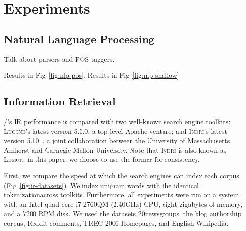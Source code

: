 \section{Experiments}

\subsection{Natural Language Processing}

Talk about parsers and POS taggers.

Results in Fig~\ref{fig:nlp-pos}.
Results in Fig~\ref{fig:nlp-shallow}.





\subsection{Information Retrieval}

\meta/'s IR performance is compared with two well-known search engine toolkits:
\textsc{Lucene}'s latest version 5.5.0\footnotemark[12], a top-level Apache
venture; and \textsc{Indri}'s latest version 5.10~\cite{lemur}, a joint
collaboration between the University of Massachusetts Amherst and Carnegie
Mellon University. Note that \textsc{Indri} is also known as \textsc{Lemur}; in
this paper, we choose to use the former for consistency.


First, we compare the speed at which the search engines can index each corpus
(Fig~\ref{fig:ir-datasets}). We index unigram words with the identical
tokenization\footnotemark[1] across toolkits. Furthermore, all experiments were
run on a system with an Intel quad core i7-2760QM (2.40GHz) CPU, eight gigabytes
of memory, and a 7200 RPM disk. We used the datasets
20newsgroups\footnotemark[6], the blog authorship corpus\footnotemark[7], Reddit
comments\footnotemark[5], TREC 2006 Homepages\footnotemark[8], and English
Wikipedia\footnotemark[9].



